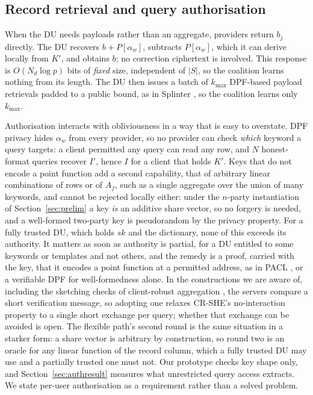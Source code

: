 \documentclass[a4paper,fleqn]{cas-dc}
\begin{document}
\subsection{Record retrieval and query authorisation}
\label{sec:auth}
When the DU needs payloads rather than an aggregate, providers return $b_j$
directly. The DU recovers $b+P[\alpha_w]$, subtracts $P[\alpha_w]$, which it
can derive locally from $K'$, and obtains $b$; no correction ciphertext is
involved. This response is $O(N_d\log p)$ bits of \emph{fixed} size,
independent of $|S|$, so the coalition learns nothing from its length. The DU
then issues a batch of $k_{\max}$ DPF-based payload retrievals padded to a
public bound, as in Splinter \citep{splinter}, so the coalition learns only
$k_{\max}$.

Authorisation interacts with obliviousness in a way that is easy to overstate.
DPF privacy hides $\alpha_w$ from every provider, so no provider can check
\emph{which} keyword a query targets: a client permitted any query can read
any row, and $N$ honest-format queries recover $I'$, hence $I$ for a client
that holds $K'$. Keys that do not encode a point function add a second
capability, that of arbitrary linear combinations of rows or of $A_f$, such as
a single aggregate over the union of many keywords, and cannot be rejected
locally either: under the $n$-party instantiation of Section~\ref{sec:prelim}
a key \emph{is} an additive share vector, so no forgery is needed, and a
well-formed two-party key is pseudorandom by the privacy property. For a fully
trusted DU, which holds $sk$ and the dictionary, none of this exceeds its
authority. It matters as soon as authority is partial, for a DU entitled to
some keywords or templates and not others, and the remedy is a proof, carried
with the key, that it encodes a point function at a permitted address, as in
PACL \citep{pacl}, or a verifiable DPF \citep{decastro2022lightweight} for
well-formedness alone. In the constructions we are aware of, including the
sketching checks of client-robust aggregation \citep{boneh2021lightweight},
the servers compare a short verification message, so adopting one relaxes
CR-SHE's no-interaction property to a single short exchange per query; whether
that exchange can be avoided is open. The flexible path's second round is
the same situation in a starker form: a share vector is arbitrary by
construction, so round two is an oracle for any linear function of the record
column, which a fully trusted DU may use and a partially trusted one must not.
Our prototype checks key shape only, and Section~\ref{sec:authresult}
measures what unrestricted query access extracts. We state per-user
authorisation as a requirement rather than a solved problem.
\end{document}
